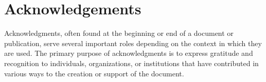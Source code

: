 \documentclass[12pt]{report}
\numberwithin{figure}{chapter}
\numberwithin{table}{chapter}
\numberwithin{equation}{chapter}
\begin{document}
\chapter*{Acknowledgements}
\thispagestyle{fancy}
Acknowledgments, often found at the beginning or end of a document or publication, serve several important roles depending on the context in which they are used. The primary purpose of acknowledgments is to express gratitude and recognition to individuals, organizations, or institutions that have contributed in various ways to the creation or support of the document. 





\newpage
{}
\printbibliography[title = {Bibliography}]
\thispagestyle{fancy}
\end{document}
